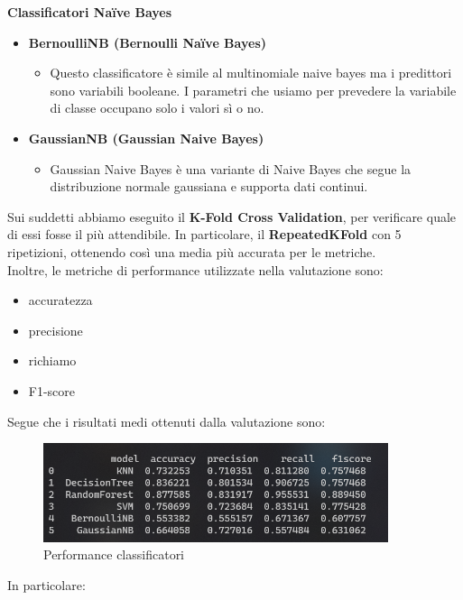 \documentclass{article}
\begin{document}
\textbf{Classificatori Naïve Bayes}
\begin{itemize}
    \item \textbf{BernoulliNB (Bernoulli Naïve Bayes)}
    \begin{itemize} \item Questo classificatore è simile al multinomiale naive bayes ma i predittori sono variabili booleane. I parametri che usiamo per prevedere la variabile di classe occupano solo i valori sì o no.
    \end{itemize}
    \item \textbf{GaussianNB (Gaussian Naive Bayes)}
    \begin{itemize} \item Gaussian Naive Bayes è una variante di Naive Bayes che segue la distribuzione normale gaussiana e supporta dati continui.
    \end{itemize}
\end{itemize}
%
Sui suddetti abbiamo eseguito  il \textbf{K-Fold Cross Validation}, per verificare quale di essi fosse il più attendibile. In particolare, il \textbf{RepeatedKFold} con 5 ripetizioni, ottenendo così una media più accurata per le metriche.\\
Inoltre, le metriche di performance utilizzate nella valutazione sono:
\begin{itemize}
    \item accuratezza 
    \item precisione
    \item richiamo
    \item F1-score
\end{itemize}

Segue che i risultati medi ottenuti dalla valutazione sono:
\begin{figure}[H]
        \includegraphics[width=0.9\textwidth]{imagModel}
        \centering
        \caption{Performance classificatori}
        \centering
\end{figure}

In particolare:
\end{document}

